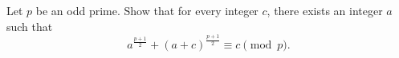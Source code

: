 Let $p$ be an odd prime. Show that for every integer $c$,  there exists an integer $a$ such that$$a^{\frac{p+1}{2}} + (a+c)^{\frac{p+1}{2}} \equiv c\pmod p.$$